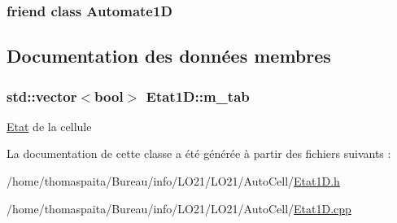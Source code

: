 \subsubsection[{\texorpdfstring{Automate1D}{Automate1D}}]{\setlength{\rightskip}{0pt plus 5cm}friend class {\bf Automate1D}\hspace{0.3cm}{\ttfamily [friend]}}\hypertarget{class_etat1_d_a7b442c5e6a2ad84fcc725706d1f77dfe}{}\label{class_etat1_d_a7b442c5e6a2ad84fcc725706d1f77dfe}


\subsection{Documentation des données membres}
\subsubsection[{\texorpdfstring{m\+\_\+tab}{m_tab}}]{\setlength{\rightskip}{0pt plus 5cm}std\+::vector$<$bool$>$ Etat1\+D\+::m\+\_\+tab\hspace{0.3cm}{\ttfamily [protected]}}\hypertarget{class_etat1_d_a07068969d6d83e95a8d04363914adf33}{}\label{class_etat1_d_a07068969d6d83e95a8d04363914adf33}
\hyperlink{class_etat}{Etat} de la cellule 

La documentation de cette classe a été générée à partir des fichiers suivants \+:\begin{DoxyCompactItemize}
\item 
/home/thomaspaita/\+Bureau/info/\+L\+O21/\+L\+O21/\+Auto\+Cell/\hyperlink{_etat1_d_8h}{Etat1\+D.\+h}\item 
/home/thomaspaita/\+Bureau/info/\+L\+O21/\+L\+O21/\+Auto\+Cell/\hyperlink{_etat1_d_8cpp}{Etat1\+D.\+cpp}\end{DoxyCompactItemize}
